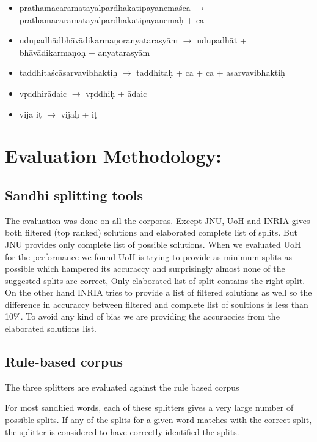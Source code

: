 \documentclass[11pt]{article}
\begin{document}
\begin{itemize}
	\item prathamacaramatay\={a}lp\={a}rdhakatipayanem\={a}\'{s}ca $\rightarrow$ prathamacaramatay\={a}lp\={a}rdhakatipayanem\={a}\d{h} + ca 
	\item udupadh\={a}dbh\={a}v\={a}dikarma\d{n}oranyatarasy\={a}m $\rightarrow$ udupadh\={a}t + bh\={a}v\={a}dikarma\d{n}o\d{h} + anyatarasy\={a}m 
	\item taddhita\'{s}c\={a}sarvavibhakti\d{h} $\rightarrow$ taddhita\d{h} + ca + ca + asarvavibhakti\d{h} 
	\item v\d{r}ddhir\={a}daic $\rightarrow$ v\d{r}ddhi\d{h} + \={a}daic 
	\item vija i\d{t} $\rightarrow$ vija\d{h} + i\d{t} 
\end{itemize}


\section{Evaluation Methodology:}
\label{sect:methodology}


\subsection{Sandhi splitting tools}
The evaluation was done on all the corporas. Except JNU, UoH and INRIA gives both filtered (top ranked) solutions and elaborated complete list of splits. But JNU provides only complete list of possible solutions. When we evaluated UoH for the performance we found UoH is trying to provide as minimum splits as possible which hampered its accuraccy and surprisingly almost none of the suggested splits are correct, Only elaborated list of split contains the right split. On the other hand INRIA tries to provide a list of filtered solutions as well so the difference in accuraccy between filtered and complete list of soultions is less than 10\%. To avoid any kind of bias we are providing the accuraccies from the elaborated solutions list.

\subsection{Rule-based corpus}
The three splitters are evaluated against the rule based corpus

For most sandhied words, each of these splitters gives a very large number of possible splits. If any of the splits for a given word matches with the correct split, the splitter is considered to have correctly identified the splits. 
\end{document}
